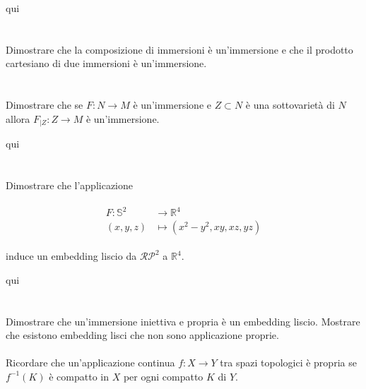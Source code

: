 qui

\section{}\label{es2-21}

\begin{tcolorbox}
	Dimostrare che la composizione di immersioni è un’immersione e che il prodotto cartesiano di due immersioni è un’immersione.
\end{tcolorbox}



\section{}\label{es2-22}

\begin{tcolorbox}
	Dimostrare che se $ F : N \to M $ è un'immersione e $ Z \subset N $ è una sottovarietà di $ N $ allora $ F_{|Z} : Z \to M $ è un'immersione.
\end{tcolorbox}

qui

\section{}\label{es2-23}

\begin{tcolorbox}
	Dimostrare che l'applicazione
	
	\begin{align}
		\begin{split}
			F : \mathbb{S}^{2} &\to \mathbb{R}^{4}\\
			(x,y,z) &\mapsto (x^{2}-y^{2},xy,xz,yz)
		\end{split}
	\end{align}
	
	induce un embedding liscio da $ \mathcal{RP}^{2} $ a $ \mathbb{R}^{4} $.
\end{tcolorbox}

qui

\section{}\label{es2-24}

\begin{tcolorbox}
	Dimostrare che un'immersione iniettiva e propria è un embedding liscio. Mostrare che esistono embedding lisci che non sono applicazione proprie.\\\\
	Ricordare che un'applicazione continua $ f : X \to Y $ tra spazi topologici è propria se $ f^{-1}(K) $ è compatto in $ X $ per ogni compatto $ K $ di $ Y $.
\end{tcolorbox}

